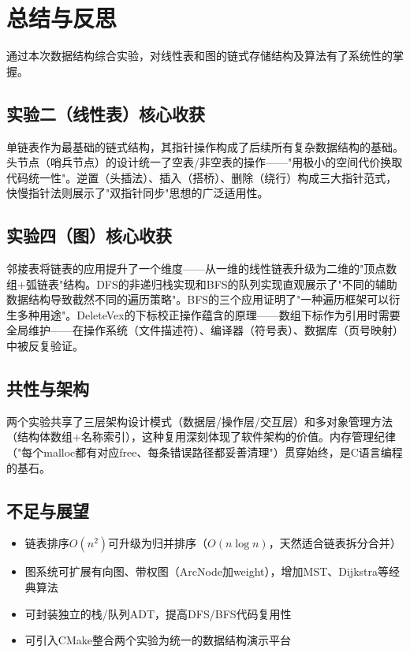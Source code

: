 \documentclass[supercite]{Experimental_Report}
\begin{document}
{\section{总结与反思}

通过本次数据结构综合实验，对线性表和图的链式存储结构及算法有了系统性的掌握。

\subsection{实验二（线性表）核心收获}

单链表作为最基础的链式结构，其指针操作构成了后续所有复杂数据结构的基础。头节点（哨兵节点）的设计统一了空表/非空表的操作——"用极小的空间代价换取代码统一性"。逆置（头插法）、插入（搭桥）、删除（绕行）构成三大指针范式，快慢指针法则展示了"双指针同步"思想的广泛适用性。

\subsection{实验四（图）核心收获}

邻接表将链表的应用提升了一个维度——从一维的线性链表升级为二维的"顶点数组+弧链表"结构。DFS的非递归栈实现和BFS的队列实现直观展示了"不同的辅助数据结构导致截然不同的遍历策略"。BFS的三个应用证明了"一种遍历框架可以衍生多种用途"。DeleteVex的下标校正操作蕴含的原理——数组下标作为引用时需要全局维护——在操作系统（文件描述符）、编译器（符号表）、数据库（页号映射）中被反复验证。

\subsection{共性与架构}

两个实验共享了三层架构设计模式（数据层/操作层/交互层）和多对象管理方法（结构体数组+名称索引），这种复用深刻体现了软件架构的价值。内存管理纪律（"每个malloc都有对应free、每条错误路径都妥善清理"）贯穿始终，是C语言编程的基石。

\subsection{不足与展望}

\begin{itemize}
    \item 链表排序$O(n^2)$可升级为归并排序（$O(n\log n)$，天然适合链表拆分合并）
    \item 图系统可扩展有向图、带权图（ArcNode加weight），增加MST、Dijkstra等经典算法
    \item 可封装独立的栈/队列ADT，提高DFS/BFS代码复用性
    \item 可引入CMake整合两个实验为统一的数据结构演示平台
\end{itemize}

}
\end{document}
